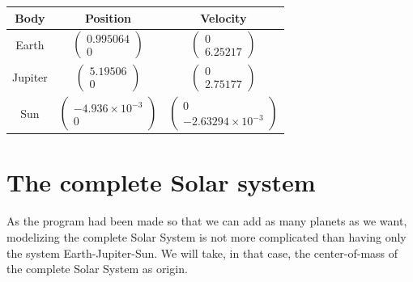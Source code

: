 \documentclass[a4paper, twoside, 11pt]{report}
\theoremstyle{theorem}
\theoremstyle{remark}
\theoremstyle{exemple}
\begin{document}
            \begin{center}           
                \begin{tabular}{|c|c|c|}
                        \hline
                    Body & Position & Velocity \\
                        \hline
                    Earth & $\left(\begin{array}{c}
                        0.995064 \\
                        0
                        \end{array}\right)$ 
                        & $\left(\begin{array}{c}
                        0 \\
                        6.25217
                        \end{array}\right)$\\
                        \hline
                    Jupiter & $\left(\begin{array}{c}
                        5.19506 \\
                        0
                        \end{array}\right)$ 
                        & $\left(\begin{array}{c}
                        0 \\
                        2.75177
                        \end{array}\right)$\\
                        \hline
                    Sun & $\left(\begin{array}{c}
                        -4.936 \times 10^{-3} \\
                        0
                        \end{array}\right)$ 
                        & $\left(\begin{array}{c}
                        0 \\
                        -2.63294 \times 10^{-3}
                        \end{array}\right)$ \\
                        \hline
                \end{tabular}
            \end{center}

    \section{The complete Solar system}
        \paragraph{}As the program had been made so that we can add as many planets as we want, modelizing the complete Solar System is not more complicated than having only the system Earth-Jupiter-Sun. We will take, in that case, the center-of-mass of the complete Solar System as origin.
        
\end{document}
